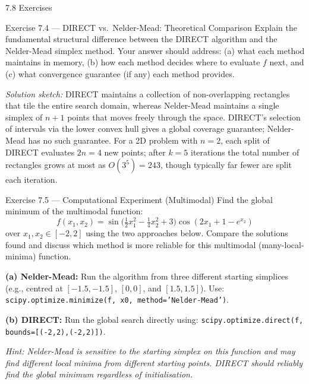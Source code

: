 \documentclass[aspectratio=169,10pt]{beamer}
\begin{document}
\begin{frame}[allowframebreaks]{7.8 Exercises}
  \framebreak

  \begin{exampleblock}{Exercise 7.4 --- DIRECT vs.\ Nelder-Mead: Theoretical Comparison}
    Explain the fundamental structural difference between the DIRECT
    algorithm and the Nelder-Mead simplex method.  Your answer should
    address: (a) what each method maintains in memory, (b) how each
    method decides where to evaluate $f$ next, and (c) what
    convergence guarantee (if any) each method provides.

    \medskip
    \textit{Solution sketch:}
    DIRECT maintains a collection of non-overlapping rectangles that
    tile the entire search domain, whereas Nelder-Mead maintains a
    single simplex of $n+1$ points that moves freely through the space.
    DIRECT's selection of intervals via the lower convex hull gives a
    global coverage guarantee; Nelder-Mead has no such guarantee.
    For a 2D problem with $n=2$, each split of DIRECT evaluates
    $2n = 4$ new points; after $k=5$ iterations the total number of
    rectangles grows at most as $O(3^5) = 243$, though typically far
    fewer are split each iteration.
  \end{exampleblock}

  \begin{exampleblock}{Exercise 7.5 --- Computational Experiment (Multimodal)}
    Find the global minimum of the multimodal function:
    \[
      f(x_1, x_2) = \sin\!\bigl(\tfrac{1}{2}x_1^2 - \tfrac{1}{4}x_2^2 + 3\bigr)
      \cos(2x_1 + 1 - e^{x_2})
    \]
    over $x_1, x_2 \in [-2, 2]$ using the two approaches below.
    Compare the solutions found and discuss which method is more
    reliable for this multimodal (many-local-minima) function.

    \medskip
    \textbf{(a) Nelder-Mead:} Run the algorithm from three different
    starting simplices (e.g., centred at $[-1.5,-1.5]$, $[0,0]$, and
    $[1.5,1.5]$).  Use:
    \texttt{scipy.optimize.minimize(f, x0, method='Nelder-Mead')}.

    \textbf{(b) DIRECT:} Run the global search directly using:
    \texttt{scipy.optimize.direct(f, bounds=[(-2,2),(-2,2)])}.

    \medskip
    \textit{Hint: Nelder-Mead is sensitive to the starting simplex
    on this function and may find different local minima from different
    starting points.  DIRECT should reliably find the global minimum
    regardless of initialisation.}
  \end{exampleblock}
\end{frame}
\end{document}
